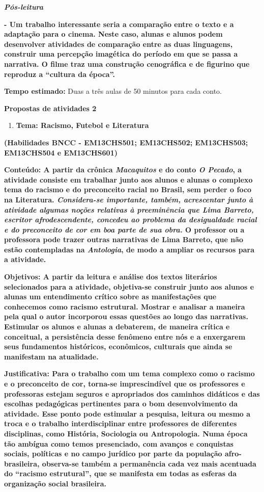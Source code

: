 \emph{\textbf{Pós-leitura}}

\textbf{- Um trabalho interessante seria a comparação entre o texto e a
adaptação para o cinema. Neste caso, alunas e alunos podem desenvolver
atividades de comparação entre as duas linguagens, construir uma
percepção imagética do período em que se passa a narrativa. O filme traz
uma construção cenográfica e de figurino que reproduz a ``cultura da
época''.}

\textbf{Tempo estimado:} Duas a três aulas de 50 minutos para cada
conto.

\textbf{Propostas de atividades 2}

\begin{enumerate}
\def\labelenumi{\arabic{enumi})}
\item
  \textbf{Tema: Racismo, Futebol e Literatura}
\end{enumerate}

\textbf{(Habilidades BNCC - EM13CHS501; EM13CHS502; EM13CHS503;
EM13CHS504 e EM13CHS601)}

\textbf{Conteúdo: A partir da crônica \emph{Macaquitos} e do conto
\emph{O Pecado}, a atividade consiste em trabalhar junto aos alunos e
alunas o complexo tema do racismo e do preconceito racial no Brasil, sem
perder o foco na Literatura. \emph{Considera-se importante, também,
acrescentar junto à atividade algumas noções relativas à preeminência
que Lima Barreto, escritor afrodescendente, concedeu ao problema da
desigualdade racial e do preconceito de cor em boa parte de sua obra.} O
professor ou a professora pode trazer outras narrativas de Lima Barreto,
que não estão contempladas na \emph{Antologia}, de modo a ampliar os
recursos para a atividade.}

\textbf{Objetivos: A partir da leitura e análise dos textos literários
selecionados para a atividade, objetiva-se construir junto aos alunos e
alunas um entendimento crítico sobre as manifestações que conhecemos
como racismo estrutural. Mostrar e analisar a maneira pela qual o autor
incorporou essas questões ao longo das narrativas. Estimular os alunos e
alunas a debaterem, de maneira crítica e conceitual, a persistência
desse fenômeno entre nós e a enxergarem seus fundamentos históricos,
econômicos, culturais que ainda se manifestam na atualidade. }

\textbf{Justificativa: Para o trabalho com um tema complexo como o
racismo e o preconceito de cor, torna-se imprescindível que os
professores e professoras estejam seguros e apropriados dos caminhos
didáticos e das escolhas pedagógicas pertinentes para o bom
desenvolvimento da atividade. Esse ponto pode estimular a pesquisa,
leitura ou mesmo a troca e o trabalho interdisciplinar entre professores
de diferentes disciplinas, como História, Sociologia ou Antropologia.
Numa época tão ambígua como temos presenciado, com avanços e conquistas
sociais, políticas e no campo jurídico por parte da população
afro-brasileira, observa-se também a permanência cada vez mais acentuada
do ``racismo estrutural'', que se manifesta em todas as esferas da
organização social brasileira. }

